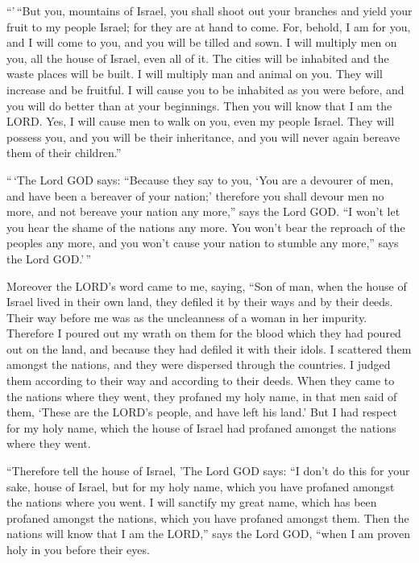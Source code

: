 ``'\,``But you, mountains of Israel, you shall shoot out
your branches and yield your fruit to my people Israel; for they are at
hand to come.  For, behold, I am for you, and I will come
to you, and you will be tilled and sown.  I will multiply
men on you, all the house of Israel, even all of it. The cities will be
inhabited and the waste places will be built.  I will
multiply man and animal on you. They will increase and be fruitful. I
will cause you to be inhabited as you were before, and you will do
better than at your beginnings. Then you will know that I am the LORD.
 Yes, I will cause men to walk on you, even my people
Israel. They will possess you, and you will be their inheritance, and
you will never again bereave them of their children.''

 ``\,`The Lord GOD says: ``Because they say to you, `You
are a devourer of men, and have been a bereaver of your nation;'
 therefore you shall devour men no more, and not bereave
your nation any more,'' says the Lord GOD.  ``I won't let
you hear the shame of the nations any more. You won't bear the reproach
of the peoples any more, and you won't cause your nation to stumble any
more,'' says the Lord GOD.'\,''

 Moreover the LORD's word came to me, saying,
 ``Son of man, when the house of Israel lived in their
own land, they defiled it by their ways and by their deeds. Their way
before me was as the uncleanness of a woman in her impurity.
 Therefore I poured out my wrath on them for the blood
which they had poured out on the land, and because they had defiled it
with their idols.  I scattered them amongst the nations,
and they were dispersed through the countries. I judged them according
to their way and according to their deeds.  When they
came to the nations where they went, they profaned my holy name, in that
men said of them, `These are the LORD's people, and have left his land.'
 But I had respect for my holy name, which the house of
Israel had profaned amongst the nations where they went.

 ``Therefore tell the house of Israel, 'The Lord GOD
says: ``I don't do this for your sake, house of Israel, but for my holy
name, which you have profaned amongst the nations where you went.
 I will sanctify my great name, which has been profaned
amongst the nations, which you have profaned amongst them. Then the
nations will know that I am the LORD,'' says the Lord GOD, ``when I am
proven holy in you before their eyes.

